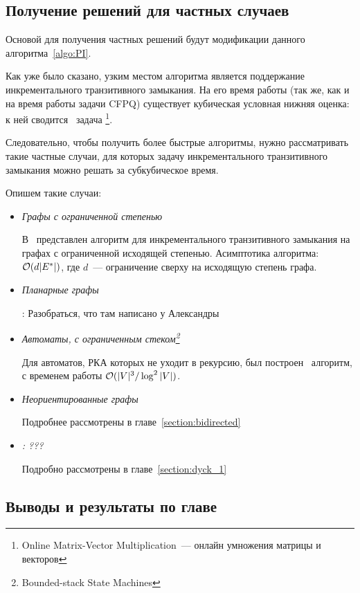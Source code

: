 \subsection{Получение решений для частных случаев}

Основой для получения частных решений будут модификации данного алгоритма~\ref{algo:PI}.

Как уже было сказано, узким местом алгоритма является поддержание инкрементального транзитивного замыкания. На его время работы (так же, как и на время работы задачи CFPQ) существует кубическая условная нижняя оценка: к ней сводится~\cite{Henzinger15} задача \footnote{Online Matrix-Vector Multiplication~--- онлайн умножения матрицы и векторов}. 

Следовательно, чтобы получить более быстрые алгоритмы, нужно рассматривать такие частные случаи, для которых задачу инкрементального транзитивного замыкания можно решать за субкубическое время.

Опишем такие случаи:

\begin{itemize}
  \item \textit{Графы с ограниченной степенью}

    В~\cite{Yellin1993} представлен алгоритм для инкрементального транзитивного замыкания на графах с ограниченной исходящей степенью. Асимптотика алгоритма: $\mathcal{O}(d |E^{*}|)$, где $d$~--- ограничение сверху на исходящую степень графа.

  \item \textit{Планарные графы}

    \TODO: Разобраться, что там написано у Александры 
  
  \item \textit{Автоматы, с ограниченным стеком\footnote{Bounded-stack State Machines}~\cite{Chaudhuri08}}

    Для автоматов, РКА которых не уходит в рекурсию, был построен~\cite{Chaudhuri08} алгоритм, с временем работы $\mathcal{O}(|V|^3 / \log^2 |V|)$.

  \item \textit{Неориентированные графы}

    Подробнее рассмотрены в главе~\ref{section:bidirected}

  \item \textit{\TODO: ???}
    
    Подробно рассмотрены в главе~\ref{section:dyck_1}

\end{itemize}

\subsection{Выводы и результаты по главе}

\TODO
